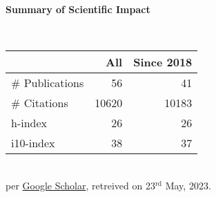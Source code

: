 \headedsection %
{\bf Summary of Scientific Impact}{}{}
{
    \qquad~~~~
    \begin{minipage}[t]{0.6\textwidth}
        \begin{tabular}{lrr}
        \hline
         & All & Since 2018\\
        \hline
        \# Publications & 56     & 41    \\
        \# Citations    & 10620  & 10183  \\
        h-index         & 26     & 26    \\
        i10-index       & 38     & 37    \\
        \hline
    \end{tabular}
    \\
    {\footnotesize{
        per \href{https://scholar.google.com/citations?user=wpLQuroAAAAJ}{Google Scholar},
        retreived on 23$^\text{rd}$ May, 2023.
        }
    }
    \end{minipage}

}
